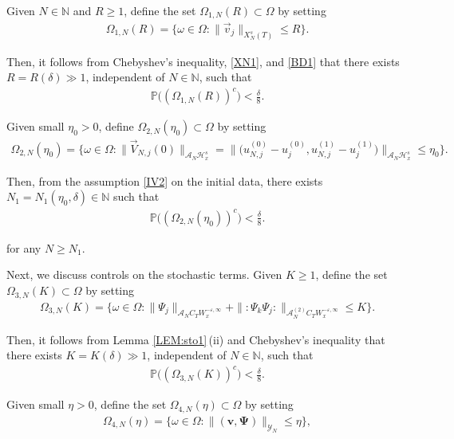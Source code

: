 \documentclass[letterpaper, 11pt,  reqno]{amsart}
\newcommand{\1}{\hspace{0.5mm}\text{I}\hspace{0.2mm}}
\newcommand{\noi}{\noindent}
\newcommand{\N}{\mathbb{N}}
\newcommand{\PP}{\mathbb{P}}
\renewcommand{\H}{\mathcal{H}}
\newcommand{\eps}{\varepsilon}
\newcommand{\dl}{\delta}
\newcommand{\A}{\mathcal{A}}
\newcommand{\Y}{\mathcal{Y}}
\newcommand{\wick}[1]{:\!{#1}\!:}
\newcommand{\vv}{\mathbf{v}}
\renewcommand{\O}{\Omega}
\renewcommand{\o}{\omega}
\numberwithin{equation}{section}
\numberwithin{theorem}{section}
\begin{document}
\noi
Given $N \in \N$ and $R \ge 1$, define
the set $\O_{1, N} (R) \subset \O$
by setting
\begin{align}
\O_{1, N}(R) = \Big\{ \o \in \O: 
\| \vec v_j \|_{X_N^s(T)}\le R\Big\}.
\label{BD2}
\end{align}

\noi
Then, it follows from  Chebyshev's  inequality, 
\eqref{XN1}, 
and \eqref{BD1} that 
there exists $R = R(\dl) \gg1 $, independent of $N \in \N$,  such that 
\begin{align}
\PP\big( (\O_{1, N}(R))^c \big) < \frac \dl 8.
\label{BD4}
\end{align}

\noi
Given small $\eta_0 > 0$,  
define $\O_{2, N}(\eta_0)\subset \O$ by setting 
\begin{align}
\O_{2, N}(\eta_0) = \big\{ \o \in \O: 
\|\vec  V_{N, j} (0)\|_{\A_N \H^s_x} 
= \big\|\big( u_{N, j}^{(0)} - u_{j}^{(0)}, u_{N, j}^{(1)} 
- u_{j}^{(1)}\big) \big\|_{\A_N \H^s_x} \le 
\eta_0\Big\}.
\label{BD5}
\end{align}


\noi
Then, from 
the assumption \eqref{IV2} on the initial data, 
there exists  $N_1 = N_1(\eta_0, \dl) \in \N$ such that
\begin{align}
\PP\big( (\O_{2, N}(\eta_0))^c \big) < \frac \dl 8.
\label{BD5a}
\end{align}



\noi
for any $N \ge N_1$.





Next, we discuss controls on the stochastic terms.
Given $K \ge 1 $, define the set $\O_{3, N}(K) \subset \O$ by setting 
\begin{align}
\O_{3, N}(K) = \Big\{ \o \in \O: \| \Psi_j \|_{\A_{N} C_T W_x^{-\eps, \infty}}
+ \| \wick{\Psi_k\Psi_j} \|_{\A^{(2)}_NC_T W^{-\eps, \infty}_x}  \le K\Big\}.
\label{BD6}
\end{align}

\noi
Then, it follows from Lemma \ref{LEM:sto1}\,(ii) 
and  Chebyshev's  inequality
that 
there exists $K  = K(\dl) \gg1 $, independent of $N \in \N$,  such that 
\begin{align}
\PP\big( (\O_{3, N}(K))^c \big) < \frac \dl 8 .
\label{BD7}
\end{align}


\noi
Given small $\eta > 0$, 
define the set 
$\O_{4, N}(\eta) \subset \O$ by setting 
\begin{align}
\O_{4, N}(\eta)
= \Big\{ \o \in \O:  
\|(\vv, \pmb \Psi) \|_{\Y_N} \le \eta
 \Big\}, 
\label{BDX}
\end{align}
\end{document}
